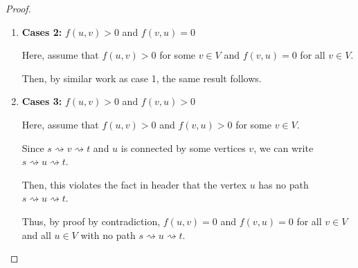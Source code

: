 \documentclass[12pt]{article}
\begin{document}
\begin{enumerate}[1.]
\begin{proof}
\begin{enumerate}[1.]
        \bigskip

        \item \textbf{Cases 2:} $f(u,v) > 0$ and $f(v,u) = 0$

        \bigskip

        Here, assume that $f(u,v) > 0$ for some $v \in V$ and $f(v,u) = 0$ for all $v \in V$.

        \bigskip

        Then, by similar work as case 1, the same result follows.

        \bigskip

        \item \textbf{Cases 3:} $f(u,v) > 0$ and $f(v,u) > 0$

        \bigskip

        Here, assume that $f(u,v) > 0$ and $f(v,u) > 0$ for some $v \in V$.

        \bigskip

        Since $s \rightsquigarrow v \rightsquigarrow t$ and $u$ is connected by some vertices $v$,
        we can write $s \rightsquigarrow u \rightsquigarrow t$.

        \bigskip

        Then, this violates the fact in header that the vertex $u$ has no path $s \rightsquigarrow u \rightsquigarrow t$.

        \bigskip

        Thus, by proof by contradiction, $f(u,v) = 0$ and $f(v,u) = 0$ for all $v \in V$ and
        all $u \in V$ with no path $s \rightsquigarrow u \rightsquigarrow t$.

    \end{enumerate}

    \end{proof}

    \bigskip







\end{enumerate}
\end{document}

